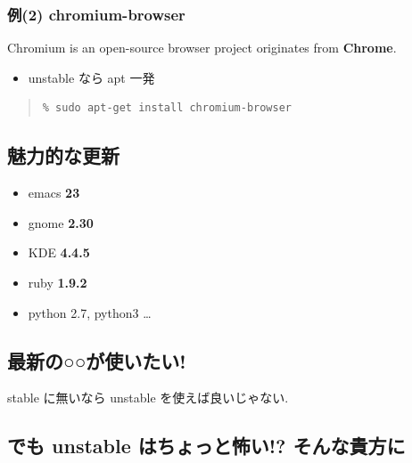 \documentclass[mingoth,a4paper]{jsarticle}
\begin{document}

\subsubsection{例(2) chromium-browser}

Chromium is an open-source browser project originates from \textbf{Chrome}.


\begin{itemize}
\item unstable なら apt 一発
\end{itemize}

\begin{quote}
\begin{verbatim}
% sudo apt-get install chromium-browser
\end{verbatim}
\end{quote}

\subsection{魅力的な更新}

\begin{itemize}
\item emacs \textbf{23}
\item gnome \textbf{2.30}
\item KDE \textbf{4.4.5}
\item ruby \textbf{1.9.2}
\item python 2.7, python3 \dots{}
\end{itemize}


\subsection{最新の○○が使いたい!}

stable に無いなら unstable を使えば良いじゃない.

\subsection{でも unstable はちょっと怖い!? そんな貴方に}
\end{document}
